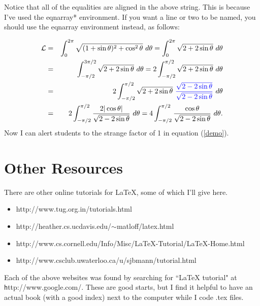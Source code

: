 \documentclass[12pt]{report} %
\begin{document}
Notice that all of the equalities are aligned in the above string.  This is because 
I've used the eqnarray* environment.  If you want a line or two to be named, you 
should use the eqnarray environment instead, as follows:

\begin{eqnarray}
{\mathcal{L}} & = & \int_0^{2\pi} \sqrt{ (1 + \sin \theta)^2 + \cos^2\theta}~d\theta =
\int_0^{2\pi} \sqrt{2 + 2\sin \theta}~d\theta \nonumber \\
& = & 
\int_{-\pi/2}^{3\pi/2} \sqrt{2 + 2\sin \theta}~d\theta
=
2\int_{-\pi/2}^{\pi/2} \sqrt{2 + 2\sin \theta}~d\theta \nonumber \\
& = & 
2\int_{-\pi/2}^{\pi/2} \sqrt{2 + 2\sin \theta}~{\color{blue}
\frac{\sqrt{2 - 2\sin\theta}}{\sqrt{2 - 2\sin\theta}}}~ d\theta \label{demo} \\
& = & 
2\int_{-\pi/2}^{\pi/2} \frac{2|\cos \theta|}{\sqrt{2 - 2\sin\theta}}~d\theta
 = 
4\int_{-\pi/2}^{\pi/2} \frac{\cos \theta}{\sqrt{2 - 2\sin\theta}}~d\theta .\nonumber 
\end{eqnarray}
Now I can alert students to the strange factor of 1 in equation (\ref{demo}). 

\setcounter{chapter}{6}
\section{Other Resources}
There are other online tutorials for \LaTeX, some of which I'll give here.

	\begin{itemize}
	\item http://www.tug.org.in/tutorials.html
	\item http://heather.cs.ucdavis.edu/$\sim$matloff/latex.html
	\item {\scriptsize http://www.cs.cornell.edu/Info/Misc/LaTeX-Tutorial/LaTeX-Home.html}
	\item http://www.csclub.uwaterloo.ca/u/sjbmann/tutorial.html
	\end{itemize}


Each of the above websites was found by searching for ``LaTeX tutorial" at
{\texttt http://www.google.com/}.  These are good starts, but I find it helpful to have an actual book (with a good index) next to the computer while I code .tex files.
\end{document}
